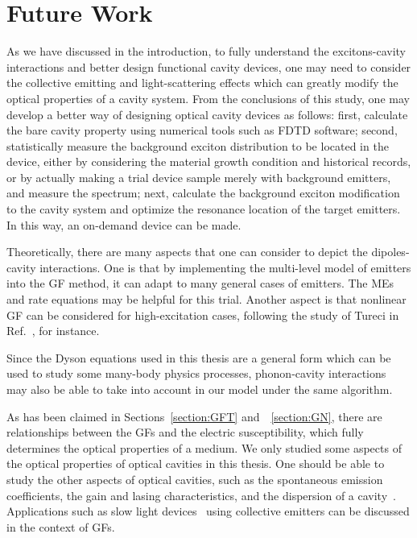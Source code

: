 \section{Future Work}
As we have discussed in the introduction, to fully understand the excitons-cavity interactions and better design functional cavity devices, one may need to consider the collective emitting and light-scattering effects which can greatly modify the optical properties of a cavity system. From the conclusions of this study, one may develop a better way of designing optical cavity devices as follows: first, calculate the bare cavity property using numerical tools such as FDTD software; second, statistically measure the background exciton distribution to be located in the device, either by considering the material growth condition and historical records, or by actually making a trial device sample merely with background emitters, and measure the spectrum; next, calculate the background exciton modification to the cavity system and optimize the resonance location of the target emitters. In this way, an on-demand device can be made.

Theoretically, there are many aspects that one can consider to depict the dipoles-cavity interactions. One is that by implementing the multi-level model of emitters into the GF method, it can adapt to many general cases of emitters. The MEs and rate equations may be helpful for this trial. Another aspect is that nonlinear GF can be considered for high-excitation cases, following the study of Tureci in Ref.~, for instance.

Since the Dyson equations used in this thesis are a general form which can be used to study some many-body physics processes, phonon-cavity interactions~\cite{Wilson-Rae2002,Brandes2005} may also be able to take into account in our model under the same algorithm.

As has been claimed in Sections~\ref{section:GFT} and~~\ref{section:GN}, there are relationships between the GFs and the electric susceptibility, which fully determines the optical properties of a medium. We only studied some aspects of the optical properties of optical cavities in this thesis. One should be able to study the other aspects of optical cavities, such as the spontaneous emission coefficients, the gain and lasing characteristics, and the dispersion of a cavity~\cite{Chow1999,Du2004}. Applications such as slow light devices~\cite{Vlasov2005,Baba2008} using collective emitters can be discussed in the context of GFs.

